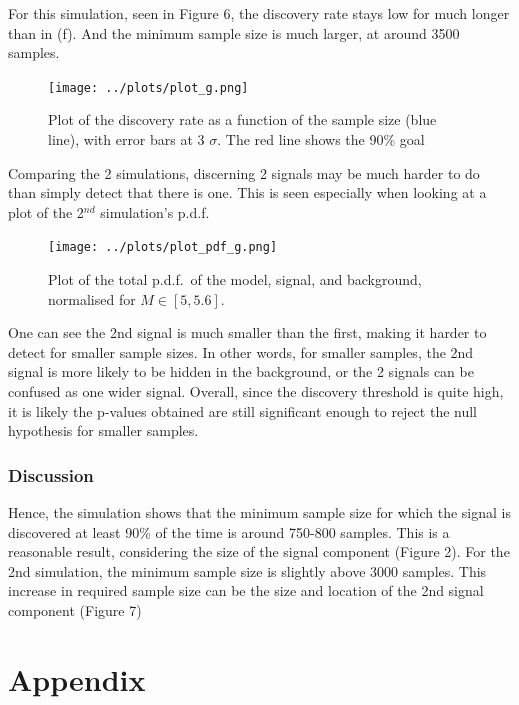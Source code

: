 \documentclass[12pt]{report} %
\begin{document}
\vspace*{1\baselineskip}
For this simulation, seen in Figure 6, the discovery rate stays low for much longer than in (f). And the minimum sample size is much larger, at around 3500 samples.

\begin{figure}[htb]
    \centering
    \texttt{[image: ../plots/plot\_g.png]}
    \captionsetup{margin=1.3cm}
    \caption[width=0.2\pdfpagewidth]{Plot of the discovery rate as a function of the sample size (blue line), with error bars at 3 $\sigma$. The red line shows the 90\% goal}
\end{figure}

\newpage
Comparing the 2 simulations, discerning 2 signals may be much harder to do than simply detect that there is one. This is seen especially when looking at a plot of the 2$^{nd}$ simulation's p.d.f.

\begin{figure}[htb]
    \centering
    \texttt{[image: ../plots/plot\_pdf\_g.png]}
    \captionsetup{margin=1.3cm}
    \caption[width=0.2\pdfpagewidth]{Plot of the total p.d.f.\ of the model, signal, and background, normalised for $M\in{[5,5.6]}$.}
\end{figure}

One can see the 2nd signal is much smaller than the first, making it harder to detect for smaller sample sizes. In other words, for smaller samples, the 2nd signal is more likely to be hidden in the background, or the 2 signals can be confused as one wider signal. Overall, since the discovery threshold is quite high, it is likely the p-values obtained are still significant enough to reject the null hypothesis for smaller samples. 
\newpage
\subsubsection*{Discussion}
Hence, the simulation shows that the minimum sample size for which the signal is discovered at least 90\% of the time is around 750-800 samples. This is a reasonable result, considering the size of the signal component (Figure 2). For the 2nd simulation, the minimum sample size is slightly above 3000 samples. This increase in required sample size can be the size and location of the 2nd signal component (Figure 7)






\section*{Appendix}
\end{document}
